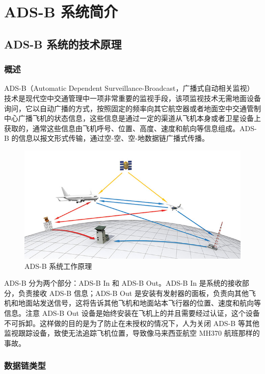 
\chapter{ADS-B 系统简介}

\section{ADS-B 系统的技术原理}

\subsection{概述}

ADS-B（Automatic Dependent Surveillance-Broadcast，广播式自动相关监视）技术是现代空中交通管理中一项非常重要的监视手段，该项监视技术无需地面设备询问，它以自动广播的方式，按照固定的频率向其它航空器或者地面空中交通管制中心广播飞机的状态信息，这些信息是通过一定的渠道从飞机本身或者卫星设备上获取的，通常这些信息由飞机呼号、位置、高度、速度和航向等信息组成。ADS-B 的信息以报文形式传输，通过空-空、空-地数据链广播式传播。

\begin{figure}[!htb]
\centering
\includegraphics[width=13cm]{pic/Advocacy_ADS_B.jpg}
\caption{ADS-B 系统工作原理}
\label{fig:Advocacy_ADS_B}
\end{figure}

ADS-B 分为两个部分：ADS-B In 和 ADS-B Out。ADS-B In 是系统的接收部分，负责接收 ADS-B 信息；ADS-B Out 是安装有发射器的面板，负责向其他飞机和地面站发送信号，这将告诉其他飞机和地面站本飞行器的位置、速度和航向等信息。注意 ADS-B Out 设备是始终安装在飞机上的并且需要经过认证，这个设备不可拆卸。这样做的目的是为了防止在未授权的情况下，人为关闭 ADS-B 等其他监视跟踪设备，致使无法追踪飞机位置，导致像马来西亚航空 MH370 航班那样的事故。

\subsection{数据链类型}

